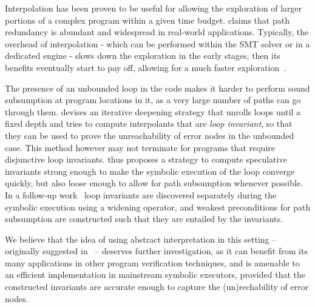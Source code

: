 {Interpolation has been proven to be useful for allowing the exploration of larger portions of a complex program within a given time budget. \cite{YYG15} claims that path redundancy is abundant and widespread in real-world applications. Typically, the overhead of interpolation - which can be performed within the SMT solver or in a dedicated engine - slows down the exploration in the early stages, then its benefits eventually start to pay off, allowing for a much faster exploration~\cite{JMN13}. 

 The presence of an unbounded loop in the code makes it harder to perform sound subsumption at program locations in it, as a very large number of paths can go through them. \cite{McMillan10} devises an iterative deepening strategy that unrolls loops until a fixed depth and tries to compute interpolants that are {\em loop invariant}, so that they can be used to prove the unreachability of error nodes in the unbounded case. This method however may not terminate for programs that require disjunctive loop invariants. \cite{JNS11} thus proposes a strategy to compute speculative invariants strong enough to make the symbolic execution of the loop converge quickly, but also loose enough to allow for path subsumption whenever possible. In a follow-up work~\cite{JMN12} loop invariants are discovered separately during the symbolic execution using a widening operator, and weakest preconditions for path subsumption are constructed such that they are entailed by the invariants.

We believe that the idea of using abstract interpretation in this setting -- originally suggested in~\cite{JSV09} -- deserves further investigation, as it can benefit from its many applications in other program verification techniques, and is amenable to an efficient implementation in mainstream symbolic executors, provided that the constructed invariants are accurate enough to capture the (un)rechability of error nodes.}

